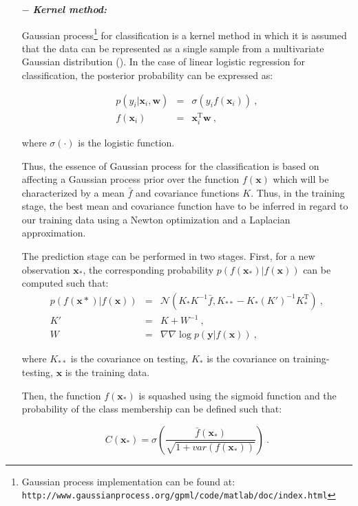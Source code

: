\begin{enumerate}[leftmargin=*]
\item[$-$] \textbf{\textit{Kernel method:}}

Gaussian process\footnote{Gaussian process implementation can be found at: \texttt{http://www.\allowbreak gaussianprocess.org/gpml/code/matlab/doc/index.html}} for classification is a kernel method in which it is assumed that the data can be represented as a single sample from a multivariate Gaussian distribution (\cite{Rasmussen2005}). In the case of linear logistic regression for classification, the posterior probability can be expressed as:

\begin{eqnarray}
	p(y_i|\mathbf{x}_i,\mathbf{w}) & = & \sigma(y_i f(\mathbf{x}_i)) \ , \label{eq:gp1} \\
	f(\mathbf{x}_i) & = & \mathbf{x}_i^{\text{T}} \mathbf{w} \ , \nonumber
\end{eqnarray}

\noindent where $\sigma(\cdot)$ is the logistic function.

Thus, the essence of Gaussian process for the classification is based on affecting a Gaussian process prior over the function $f(\mathbf{x})$ which will be characterized by a mean $\bar{f}$ and covariance functions $K$. Thus, in the training stage, the best mean and covariance function have to be inferred in regard to our training data using a Newton optimization and a Laplacian approximation.

The prediction stage can be performed in two stages. First, for a new observation $\mathbf{x}_*$, the corresponding probability $p(f(\mathbf{x}_*)|f(\mathbf{x}))$ can be computed such that:
\begin{eqnarray}
	p(f(\mathbf{x}*)|f(\mathbf{x})) & = & \mathcal{N}( K_*K^{-1}\bar{f}, K_{**}-K_*(K')^{-1}K_*^{\text{T}} ) \ , \nonumber \\
	K' & = & K + W^{-1} \ , \label{eq:gp2} \\
	W & = & \nabla \nabla \log p(\mathbf{y}|f(\mathbf{x})) \ , \nonumber
\end{eqnarray}

\noindent where $K_{**}$ is the covariance on testing, $K_{*}$ is the covariance on training-testing, $\mathbf{x}$ is the training data.

Then, the function $f(\mathbf{x}_*)$ is squashed using the sigmoid function and the probability of the class membership can be defined such that:

\begin{equation}
	C(\mathbf{x}_*) = \sigma\left( \frac{\bar{f}(\mathbf{x_*})}{\sqrt{1+var(f(\mathbf{x}_*))}} \right) \ .
	\label{eq:gp3}
\end{equation}


\end{enumerate}
